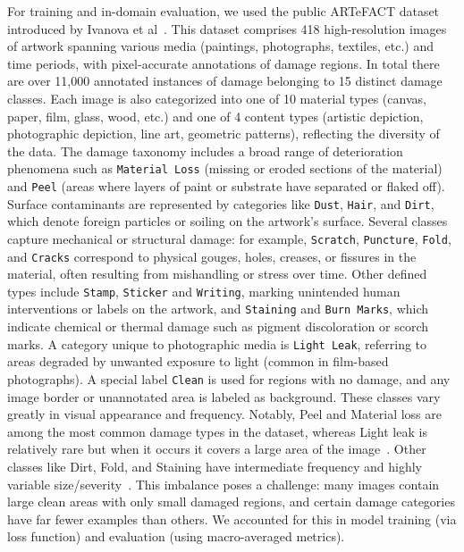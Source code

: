 \documentclass[conference]{IEEEtran}
\begin{document}
For training and in-domain evaluation, we used the public ARTeFACT dataset introduced by Ivanova et al~\cite{ivanova_artefact_2024}. This dataset comprises 418 high-resolution images of artwork spanning various media (paintings, photographs, textiles, etc.) and time periods, with pixel-accurate annotations of damage regions. In total there are over 11,000 annotated instances of damage belonging to 15 distinct damage classes. Each image is also categorized into one of 10 material types (canvas, paper, film, glass, wood, etc.) and one of 4 content types (artistic depiction, photographic depiction, line art, geometric patterns), reflecting the diversity of the data. The damage taxonomy includes a broad range of deterioration phenomena such as \lstinline|Material Loss| (missing or eroded sections of the material) and \lstinline|Peel| (areas where layers of paint or substrate have separated or flaked off). Surface contaminants are represented by categories like \lstinline|Dust|, \lstinline|Hair|, and \lstinline|Dirt|, which denote foreign particles or soiling on the artwork’s surface. Several classes capture mechanical or structural damage: for example, \lstinline|Scratch|, \lstinline|Puncture|, \lstinline|Fold|, and \lstinline|Cracks| correspond to physical gouges, holes, creases, or fissures in the material, often resulting from mishandling or stress over time. Other defined types include \lstinline|Stamp|, \lstinline|Sticker| and \lstinline|Writing|, marking unintended human interventions or labels on the artwork, and \lstinline|Staining| and \lstinline|Burn Marks|, which indicate chemical or thermal damage such as pigment discoloration or scorch marks. A category unique to photographic media is \lstinline|Light Leak|, referring to areas degraded by unwanted exposure to light (common in film-based photographs). A special label \lstinline|Clean| is used for regions with no damage, and any image border or unannotated area is labeled as background. These classes vary greatly in visual appearance and frequency. Notably, Peel and Material loss are among the most common damage types in the dataset, whereas Light leak is relatively rare but when it occurs it covers a large area of the image~\cite{ivanova_artefact_2024}. Other classes like Dirt, Fold, and Staining have intermediate frequency and highly variable size/severity~\cite{ivanova_artefact_2024}. This imbalance poses a challenge: many images contain large clean areas with only small damaged regions, and certain damage categories have far fewer examples than others. We accounted for this in model training (via loss function) and evaluation (using macro-averaged metrics).
\end{document}

